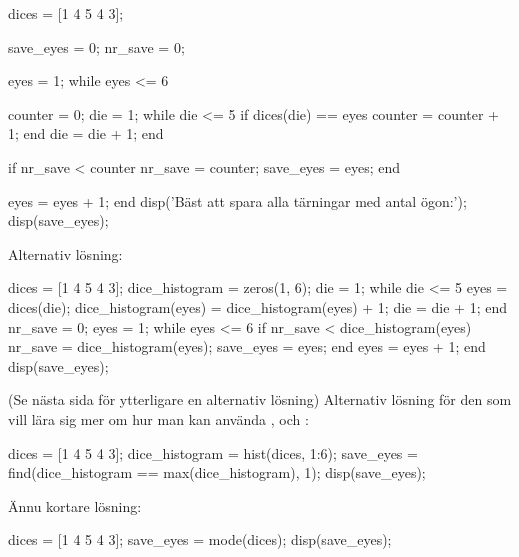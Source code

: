 

\vspace{3pt}
\begin{matlab}
dices = [1 4 5 4 3]; %

save_eyes = 0; %
nr_save = 0; %

eyes = 1;
while eyes <= 6

  counter = 0;
  die = 1;
  while die <= 5
    if dices(die) == eyes
        counter = counter + 1;
    end
    die = die + 1;
  end

  if nr_save < counter
    nr_save = counter;
    save_eyes = eyes;
  end

  eyes = eyes + 1;
end
disp('Bäst att spara alla tärningar med antal ögon:');
disp(save_eyes);
\end{matlab}

Alternativ lösning:
\vspace{10pt}
\begin{matlab}
dices = [1 4 5 4 3]; %
dice_histogram = zeros(1, 6);
die = 1;
while die <= 5
	eyes = dices(die);
	dice_histogram(eyes) = dice_histogram(eyes) + 1;
	die = die + 1;
end
nr_save = 0;
eyes = 1;
while eyes <= 6
	if nr_save < dice_histogram(eyes)
		nr_save = dice_histogram(eyes);
		save_eyes = eyes;
	end
	eyes = eyes + 1;
end
disp(save_eyes);
\end{matlab}
(Se nästa sida för ytterligare en alternativ lösning)
\newpage
Alternativ lösning för den som vill lära sig mer om hur man kan använda ,  och :
\vspace{10pt}
\begin{matlab}
dices = [1 4 5 4 3]; %
dice_histogram = hist(dices, 1:6);
save_eyes = find(dice_histogram == max(dice_histogram), 1);
disp(save_eyes);
\end{matlab}

Ännu kortare lösning:
\vspace{10pt}
\begin{matlab}
dices = [1 4 5 4 3]; %
save_eyes = mode(dices);
disp(save_eyes);
\end{matlab}

